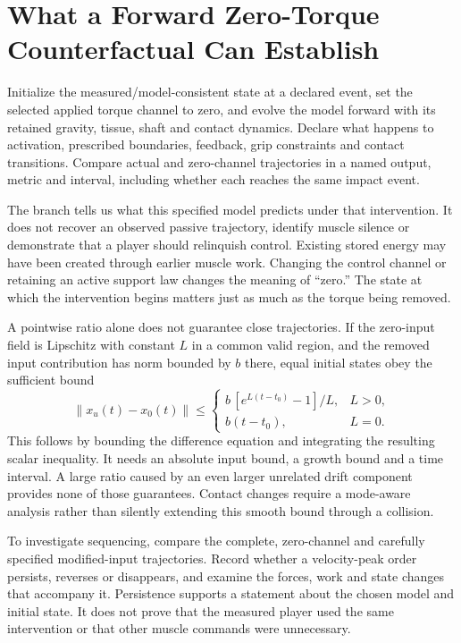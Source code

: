 \section{What a Forward Zero-Torque Counterfactual Can Establish}

Initialize the measured/model-consistent state at a declared event, set the selected applied torque channel to zero, and evolve the model forward with its retained gravity, tissue, shaft and contact dynamics. Declare what happens to activation, prescribed boundaries, feedback, grip constraints and contact transitions. Compare actual and zero-channel trajectories in a named output, metric and interval, including whether each reaches the same impact event.

The branch tells us what this specified model predicts under that intervention. It does not recover an observed passive trajectory, identify muscle silence or demonstrate that a player should relinquish control. Existing stored energy may have been created through earlier muscle work. Changing the control channel or retaining an active support law changes the meaning of ``zero.'' The state at which the intervention begins matters just as much as the torque being removed.

A pointwise ratio alone does not guarantee close trajectories. If the zero-input field is Lipschitz with constant $L$ in a common valid region, and the removed input contribution has norm bounded by $b$ there, equal initial states obey the sufficient bound
\begin{equation}
\|x_u(t)-x_0(t)\|\leq
\begin{cases}
b\,[e^{L(t-t_0)}-1]/L,&L>0,\\
b(t-t_0),&L=0.
\end{cases}
\label{eq:complete_ztcf_bound}
\end{equation}
This follows by bounding the difference equation and integrating the resulting scalar inequality. It needs an absolute input bound, a growth bound and a time interval. A large ratio caused by an even larger unrelated drift component provides none of those guarantees. Contact changes require a mode-aware analysis rather than silently extending this smooth bound through a collision.

To investigate sequencing, compare the complete, zero-channel and carefully specified modified-input trajectories. Record whether a velocity-peak order persists, reverses or disappears, and examine the forces, work and state changes that accompany it. Persistence supports a statement about the chosen model and initial state. It does not prove that the measured player used the same intervention or that other muscle commands were unnecessary.

